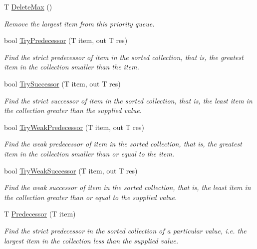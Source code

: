 \begin{DoxyCompactItemize}
T \hyperlink{class_c5_1_1_tree_bag_a8badc5e1f0108389b265baf622cf9482}{Delete\+Max} ()
\begin{DoxyCompactList}\small\item\em Remove the largest item from this priority queue. \end{DoxyCompactList}\item 
bool \hyperlink{class_c5_1_1_tree_bag_adf6e07683fa2f4d1bd95998fc9b91bee}{Try\+Predecessor} (T item, out T res)
\begin{DoxyCompactList}\small\item\em Find the strict predecessor of item in the sorted collection, that is, the greatest item in the collection smaller than the item. \end{DoxyCompactList}\item 
bool \hyperlink{class_c5_1_1_tree_bag_a8c1bee7d26507a90a7b95f0d807edb4e}{Try\+Successor} (T item, out T res)
\begin{DoxyCompactList}\small\item\em Find the strict successor of item in the sorted collection, that is, the least item in the collection greater than the supplied value. \end{DoxyCompactList}\item 
bool \hyperlink{class_c5_1_1_tree_bag_a970521eadc2a157952c9d32526b21ac9}{Try\+Weak\+Predecessor} (T item, out T res)
\begin{DoxyCompactList}\small\item\em Find the weak predecessor of item in the sorted collection, that is, the greatest item in the collection smaller than or equal to the item. \end{DoxyCompactList}\item 
bool \hyperlink{class_c5_1_1_tree_bag_aa319fccaa62e5d30b7f7a3a2d0b93459}{Try\+Weak\+Successor} (T item, out T res)
\begin{DoxyCompactList}\small\item\em Find the weak successor of item in the sorted collection, that is, the least item in the collection greater than or equal to the supplied value. \end{DoxyCompactList}\item 
T \hyperlink{class_c5_1_1_tree_bag_a4e71f3361784108ccadab66f46e4aa07}{Predecessor} (T item)
\begin{DoxyCompactList}\small\item\em Find the strict predecessor in the sorted collection of a particular value, i.\+e. the largest item in the collection less than the supplied value. \end{DoxyCompactList}\item 

\end{DoxyCompactItemize}
